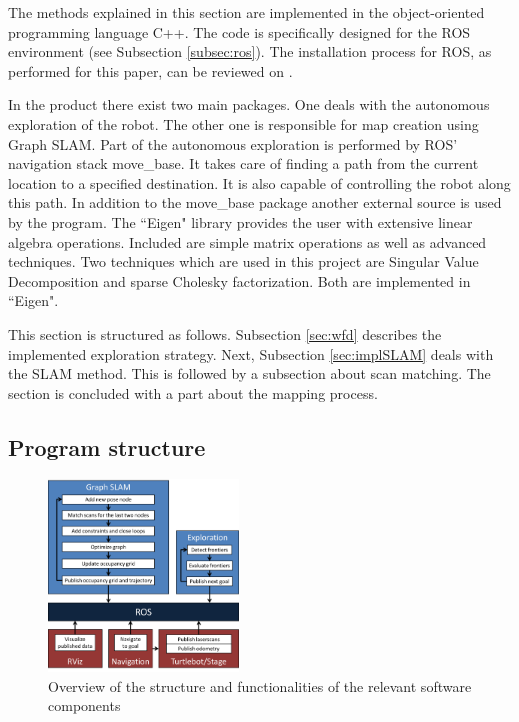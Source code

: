 \documentclass{ba-kecs}
\begin{document}
The methods explained in this section are implemented in the object-oriented programming language C++. The code is specifically designed for the ROS environment (see Subsection \ref{subsec:ros}). The installation process for ROS, as performed for this paper, can be reviewed on \cite{swarmlab}.

In the product there exist two main packages. One deals with the autonomous exploration of the robot. The other one is responsible for map creation using Graph SLAM. Part of the autonomous exploration is performed by ROS' navigation stack move\_base. It takes care of finding a path from the current location to a specified destination. It is also capable of controlling the robot along this path. In addition to the move\_base package another external source is used by the program. The ``Eigen" library \citep{eigen} provides the user with extensive linear algebra operations. Included are simple matrix operations as well as advanced techniques. Two techniques which are used in this project are Singular Value Decomposition and sparse Cholesky factorization. Both are implemented in ``Eigen".

This section is structured as follows. Subsection \ref{sec:wfd} describes the implemented exploration strategy. Next, Subsection \ref{sec:implSLAM} deals with the SLAM method. This is followed by a subsection about scan matching. The section is concluded with a part about the mapping process. 

\subsection{Program structure}
\begin{figure}[htbp]
	\centering
		\includegraphics[width=0.45\textwidth]{figures/Program_structure.png}
	\caption{Overview of the structure and functionalities of the relevant software components}
	\label{fig:program_structure}
\end{figure}
\end{document}
